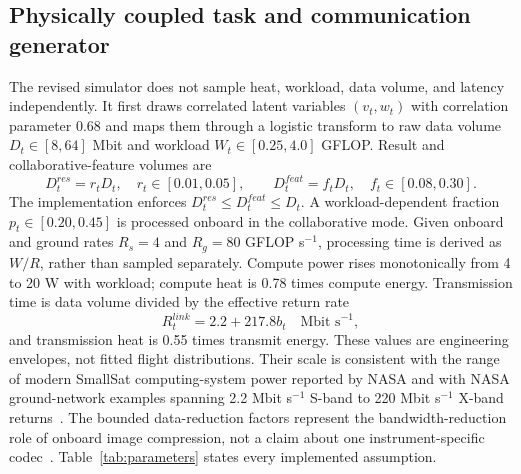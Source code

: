 \documentclass[11pt]{article}
\begin{document}
\begin{table}[H]
\centering
\caption{Implemented 15-dimensional task descriptor dictionary. The six appended resource coordinates are $h$, $e$, $q$, compute utilization $u$, bandwidth $b$, and contact duration $\tau$.}
\label{tab:state_dictionary}
\resizebox{\textwidth}{!}{}
\end{table}

\subsection{Physically coupled task and communication generator}

The revised simulator does not sample heat, workload, data volume, and latency independently. It first draws correlated latent variables $(v_t,w_t)$ with correlation parameter 0.68 and maps them through a logistic transform to raw data volume $D_t\in[8,64]$ Mbit and workload $W_t\in[0.25,4.0]$ GFLOP. Result and collaborative-feature volumes are
\begin{equation}
D_t^{res}=r_tD_t,\quad r_t\in[0.01,0.05],\qquad
D_t^{feat}=f_tD_t,\quad f_t\in[0.08,0.30].
\end{equation}
The implementation enforces $D_t^{res}\le D_t^{feat}\le D_t$. A workload-dependent fraction $p_t\in[0.20,0.45]$ is processed onboard in the collaborative mode. Given onboard and ground rates $R_s=4$ and $R_g=80$ GFLOP s$^{-1}$, processing time is derived as $W/R$, rather than sampled separately. Compute power rises monotonically from 4 to 20 W with workload; compute heat is 0.78 times compute energy. Transmission time is data volume divided by the effective return rate
\begin{equation}
R_t^{link}=2.2+217.8b_t\quad\text{Mbit s}^{-1},
\end{equation}
and transmission heat is 0.55 times transmit energy. These values are engineering envelopes, not fitted flight distributions. Their scale is consistent with the range of modern SmallSat computing-system power reported by NASA and with NASA ground-network examples spanning 2.2 Mbit s$^{-1}$ S-band to 220 Mbit s$^{-1}$ X-band returns~\cite{nasa2026avionics,nasa2026ground}. The bounded data-reduction factors represent the bandwidth-reduction role of onboard image compression, not a claim about one instrument-specific codec~\cite{ccsds122}. Table~\ref{tab:parameters} states every implemented assumption.

\begin{table}[H]
\centering
\caption{Physical primitives and provenance of the revised simulator. Values define a transparent engineering envelope; they are not presented as a fitted flight distribution.}
\label{tab:parameters}
\resizebox{\textwidth}{!}{}
\end{table}
\end{document}
